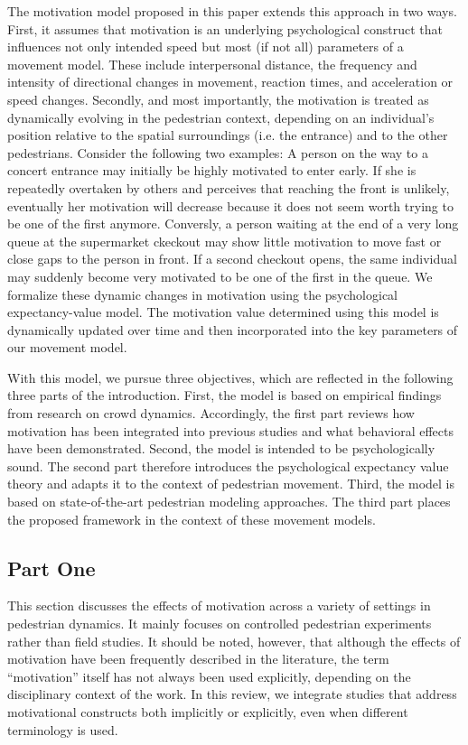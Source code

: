 \documentclass[pdflatex,sn-mathphys-num]{sn-jnl}%
\theoremstyle{thmstyleone}%
\theoremstyle{thmstyletwo}%
\theoremstyle{thmstylethree}%
\begin{document}
The motivation model proposed in this paper extends this approach in two ways. First, it assumes that motivation is an underlying psychological construct that influences not only intended speed but most (if not all) parameters of a movement model. These include interpersonal distance, the frequency and intensity of directional changes in movement, reaction times, and acceleration or speed changes. Secondly, and most importantly, the motivation is treated as dynamically evolving in the pedestrian context, depending on an individual's position relative to the spatial surroundings (i.e. the entrance) and to the other pedestrians. Consider the following two examples: A person on the way to a concert entrance may initially be highly motivated to enter early. If she is repeatedly overtaken by others and perceives that reaching the front is unlikely, eventually her motivation will decrease because it does not seem worth trying to be one of the first anymore. Conversly, a person waiting at the end of a very long queue at the supermarket ckeckout may show little motivation to move fast or close gaps to the person in front. If a second checkout opens, the same individual may suddenly become very motivated to be one of the first in the queue. We formalize these dynamic changes in motivation using the psychological expectancy-value model. The motivation value determined using this model is dynamically updated over time and then incorporated into the key parameters of our movement model.

With this model, we pursue three objectives, which are reflected in the following three parts of the introduction. First, the model is based on empirical findings from research on crowd dynamics. Accordingly, the first part reviews how motivation has been integrated into previous studies and what behavioral effects have been demonstrated. Second, the model is intended to be psychologically sound. The second part therefore introduces the psychological expectancy value theory and adapts it to the context of pedestrian movement. Third, the model is based on state-of-the-art pedestrian modeling approaches. The third part places the proposed framework in the context of these movement models.

\subsection{Part One} 

This section discusses the effects of motivation across a variety of settings in pedestrian dynamics. It mainly focuses on controlled pedestrian experiments rather than field studies. It should be noted, however, that although the effects of motivation have been frequently described in the literature, the term “motivation” itself has not always been used explicitly, depending on the disciplinary context of the work. In this review, we integrate studies that address motivational constructs both implicitly or explicitly, even when different terminology is used. 
\end{document}
